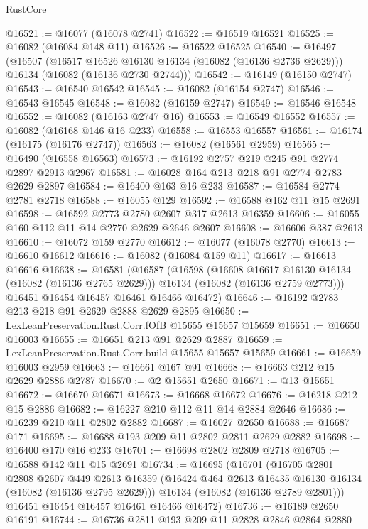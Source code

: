 \begin{lexlean}{RustCore}
\begin{coremodule}
@16521 := @16077 (@16078 @2741)
@16522 := @16519 @16521
@16525 := @16082 (@16084 @148 @11)
@16526 := @16522 @16525
@16540 := @16497
    (@16507
      (@16517 @16526 @16130 @16134 (@16082 (@16136 @2736 @2629)))
      @16134
      (@16082 (@16136 @2730 @2744)))
@16542 := @16149 (@16150 @2747)
@16543 := @16540 @16542
@16545 := @16082 (@16154 @2747)
@16546 := @16543 @16545
@16548 := @16082 (@16159 @2747)
@16549 := @16546 @16548
@16552 := @16082 (@16163 @2747 @16)
@16553 := @16549 @16552
@16557 := @16082 (@16168 @146 @16 @233)
@16558 := @16553 @16557
@16561 := @16174 (@16175 (@16176 @2747))
@16563 := @16082 (@16561 @2959)
@16565 := @16490 (@16558 @16563)
@16573 := @16192 @2757 @219 @245 @91 @2774 @2897 @2913 @2967
@16581 := @16028 @164 @213 @218 @91 @2774 @2783 @2629 @2897
@16584 := @16400 @163 @16 @233
@16587 := @16584 @2774 @2781 @2718
@16588 := @16055 @129
@16592 := @16588 @162 @11 @15 @2691
@16598 := @16592 @2773 @2780 @2607 @317 @2613 @16359
@16606 := @16055 @160 @112 @11 @14 @2770 @2629 @2646 @2607
@16608 := @16606 @387 @2613
@16610 := @16072 @159 @2770
@16612 := @16077 (@16078 @2770)
@16613 := @16610 @16612
@16616 := @16082 (@16084 @159 @11)
@16617 := @16613 @16616
@16638 := @16581
    (@16587
      (@16598
        (@16608 @16617 @16130 @16134 (@16082 (@16136 @2765 @2629)))
        @16134
        (@16082 (@16136 @2759 @2773)))
      @16451
      @16454
      @16457
      @16461
      @16466
      @16472)
@16646 := @16192 @2783 @213 @218 @91 @2629 @2888 @2629 @2895
@16650 := LexLeanPreservation.Rust.Corr.fOfB @15655 @15657 @15659
@16651 := @16650 @16003
@16655 := @16651 @213 @91 @2629 @2887
@16659 := LexLeanPreservation.Rust.Corr.build @15655 @15657 @15659
@16661 := @16659 @16003 @2959
@16663 := @16661 @167 @91
@16668 := @16663 @212 @15 @2629 @2886 @2787
@16670 := @2 @15651 @2650
@16671 := @13 @15651
@16672 := @16670 @16671
@16673 := @16668 @16672
@16676 := @16218 @212 @15 @2886
@16682 := @16227 @210 @112 @11 @14 @2884 @2646
@16686 := @16239 @210 @11 @2802 @2882
@16687 := @16027 @2650
@16688 := @16687 @171
@16695 := @16688 @193 @209 @11 @2802 @2811 @2629 @2882
@16698 := @16400 @170 @16 @233
@16701 := @16698 @2802 @2809 @2718
@16705 := @16588 @142 @11 @15 @2691
@16734 := @16695
    (@16701
      (@16705
        @2801
        @2808
        @2607
        @449
        @2613
        @16359
        (@16424 @464 @2613 @16435 @16130 @16134 (@16082 (@16136 @2795 @2629)))
        @16134
        (@16082 (@16136 @2789 @2801)))
      @16451
      @16454
      @16457
      @16461
      @16466
      @16472)
@16736 := @16189 @2650 @16191
@16744 := @16736 @2811 @193 @209 @11 @2828 @2846 @2864 @2880

\end{coremodule}
\end{lexlean}
